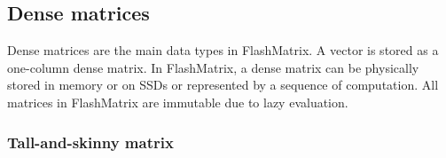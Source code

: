 

\subsection{Dense matrices}
Dense matrices are the main data types in FlashMatrix. A vector is stored
as a one-column dense matrix. In FlashMatrix, a dense matrix can be physically
stored in memory or on SSDs or represented by a sequence of computation.
All matrices in FlashMatrix are immutable due to lazy evaluation.


\subsubsection{Tall-and-skinny matrix} \label{sec:tas_mat}

